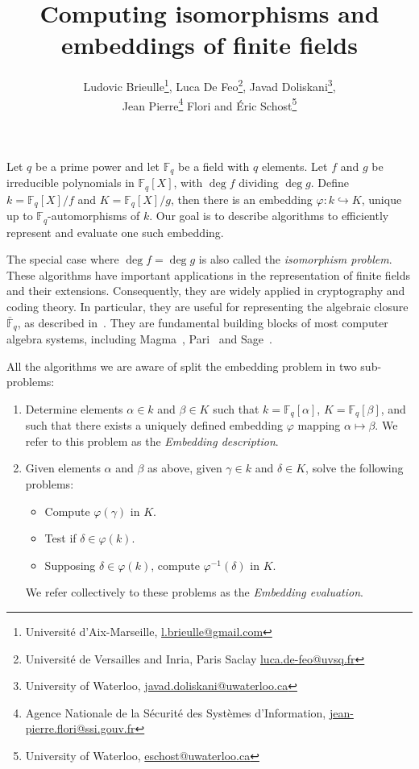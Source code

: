 \documentclass[12pt]{article}
\title{Computing isomorphisms and embeddings of finite fields}
\author{Ludovic Brieulle\footnote{
    Université d'Aix-Marseille,
    \url{l.brieulle@gmail.com}
  },
  Luca De Feo\footnote{
    Université de Versailles and Inria, Paris Saclay
    \url{luca.de-feo@uvsq.fr}
  },
  Javad Doliskani\footnote{
    University of Waterloo,
    \url{javad.doliskani@uwaterloo.ca}
  },
  \\ Jean Pierre\footnote{
    Agence Nationale de la Sécurité des Systèmes d'Information,
    \url{jean-pierre.flori@ssi.gouv.fr}
  }
  Flori and Éric Schost\footnote{
    University of Waterloo,
    \url{eschost@uwaterloo.ca}
  }
}
\def\F {\ensuremath{\mathbb{F}}}
\begin{document}
\maketitle

Let $q$ be a prime power and let $\F_q$ be a field with $q$
elements. Let $f$ and $g$ be irreducible polynomials in $\F_q[X]$,
with $\deg f$ dividing $\deg g$. Define $k=\F_q[X]/f$ and
$K=\F_q[X]/g$, then there is an embedding $\varphi:k\hookrightarrow
K$, unique up to \mbox{$\F_q$-auto}morphisms of $k$. Our goal is to
describe algorithms to efficiently represent and evaluate one such
embedding.

The special case where $\deg f = \deg g$ is also called the
\emph{isomorphism problem}. These algorithms have important
applications in the representation of finite fields and their
extensions. Consequently, they are widely applied in cryptography and
coding theory. In particular, they are useful for representing the
algebraic closure $\bar{\F}_q$, as described
in~\cite{bosma+cannon+steel97}. They are fundamental building blocks
of most computer algebra systems, including Magma~\cite{MAGMA},
Pari~\cite{Pari} and Sage~\cite{Sage}.

All the algorithms we are aware of split the embedding problem in two
sub-problems:
\begin{enumerate}
\item Determine elements $\alpha\in k$ and $\beta\in K$ such that
  $k=\F_q[\alpha]$, $K=\F_q[\beta]$, and such that there exists a
  uniquely defined embedding $\varphi$ mapping
  $\alpha\mapsto\beta$. We refer to this problem as the
  \emph{Embedding description}.
\item Given elements $\alpha$ and $\beta$ as above, given $\gamma\in
  k$ and $\delta\in K$, solve the following problems:
  \begin{itemize}
  \item Compute $\varphi(\gamma)$ in $K$.
  \item Test if $\delta\in\varphi(k)$.
  \item Supposing $\delta\in\varphi(k)$, compute $\varphi^{-1}(\delta)$ in $K$.
  \end{itemize}
  We refer collectively to these problems as the \emph{Embedding
    evaluation}.
\end{enumerate}
\end{document}
